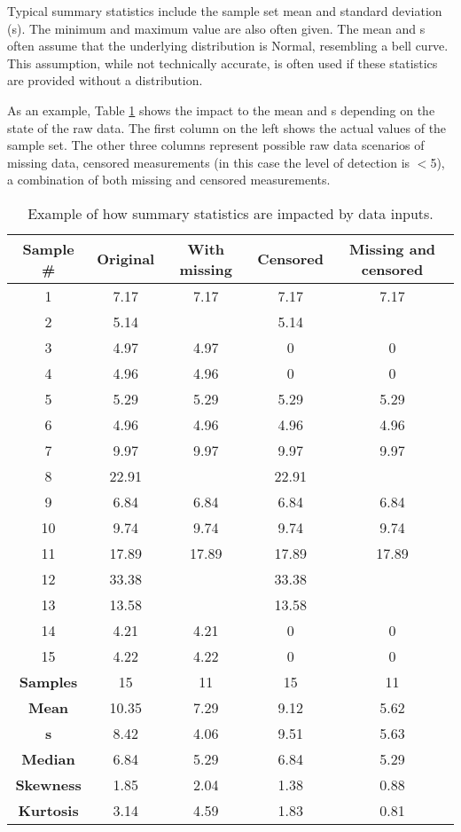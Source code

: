 Typical summary statistics include the sample set mean and standard deviation (s). The minimum and maximum value are also often given. The mean and s often assume that the underlying distribution is Normal, resembling a bell curve. This assumption, while not technically accurate, is often used if these statistics are provided without a distribution.

As an example, Table \ref{tab:diffdata} shows the impact to the mean and s depending on the state of the raw data. The first column on the left shows the actual values of the sample set. The other three columns represent possible raw data scenarios of missing data, censored measurements (in this case the level of detection is $<$5), a combination of both missing and censored measurements. 

\begin{table}[H]
\centering
\caption{Example of how summary statistics are impacted by data inputs.}
\label{tab:diffdata}
\begin{tabular}{@{}ccccc@{}}
\toprule
\textbf{Sample \#} & \textbf{Original} & \textbf{With missing} & \textbf{Censored} & \textbf{Missing and censored} \\ \midrule
1 & 7.17 & 7.17 & 7.17 & 7.17 \\
2 & 5.14 &  & 5.14 &  \\
3 & 4.97 & 4.97 & 0 & 0 \\
4 & 4.96 & 4.96 & 0 & 0 \\
5 & 5.29 & 5.29 & 5.29 & 5.29 \\
6 & 4.96 & 4.96 & 4.96 & 4.96 \\
7 & 9.97 & 9.97 & 9.97 & 9.97 \\
8 & 22.91 &  & 22.91 &  \\
9 & 6.84 & 6.84 & 6.84 & 6.84 \\
10 & 9.74 & 9.74 & 9.74 & 9.74 \\
11 & 17.89 & 17.89 & 17.89 & 17.89 \\
12 & 33.38 &  & 33.38 &  \\
13 & 13.58 &  & 13.58 &  \\
14 & 4.21 & 4.21 & 0 & 0 \\
15 & 4.22 & 4.22 & 0 & 0 \\ \midrule
\textbf{Samples} & 15 & 11 & 15 & 11 \\
\textbf{Mean} & 10.35 & 7.29 & 9.12 & 5.62 \\
\textbf{s} & 8.42 & 4.06 & 9.51 & 5.63 \\
\textbf{Median} & 6.84 & 5.29 & 6.84 & 5.29 \\
\textbf{Skewness} & 1.85 & 2.04 & 1.38 & 0.88 \\
\textbf{Kurtosis} & 3.14 & 4.59 & 1.83 & 0.81 \\ \bottomrule
\end{tabular}
\end{table}


